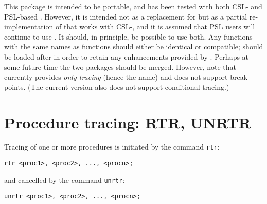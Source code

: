 This package is intended to be portable, and has been tested with both
CSL- and PSL-based \REDUCE{}.  However, it is intended not as a
replacement for \rdebug{} but as a partial re-implementation of
\rdebug{} that works with CSL-\REDUCE{}, and it is assumed that PSL
users will continue to use \rdebug{}.  It should, in principle, be
possible to use both.  Any \rtrace{} functions with the same names as
\rdebug{} functions should either be identical or compatible;
\rtrace{} should be loaded after \rdebug{} in order to retain any
enhancements provided by \rtrace{}.  Perhaps at some future time the
two packages should be merged.  However, note that \rtrace{} currently
provides \emph{only tracing} (hence the name) and does not support
break points.  (The current version also does not support conditional
tracing.)

\section{Procedure tracing: RTR, UNRTR}

\hypertarget{command:RTR}{}
\hypertarget{command:UNRTR}{}
Tracing of one or more procedures is initiated by the command
\texttt{rtr}:
\begin{verbatim}
rtr <proc1>, <proc2>, ..., <procn>;
\end{verbatim}
and cancelled by the command \texttt{unrtr}:
\begin{verbatim}
unrtr <proc1>, <proc2>, ..., <procn>;
\end{verbatim}

